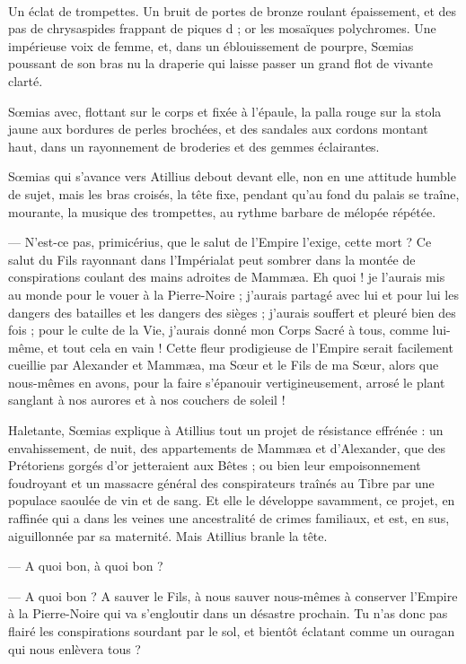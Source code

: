 \documentclass[a4paper, 11pt, oneside, polutonikogreek, french]{article}
\begin{document}
\paragraph{}
Un éclat de trompettes. Un bruit de portes de bronze roulant épaissement, et des pas de chrysaspides frappant de piques d ; or les mosaïques polychromes. Une impérieuse voix de femme, et, dans un éblouissement de pourpre, Sœmias poussant de son bras nu la draperie qui laisse passer un grand flot de vivante clarté.

Sœmias avec, flottant sur le corps et fixée à l'épaule, la palla rouge sur la stola jaune aux bordures de perles brochées, et des sandales aux cordons montant haut, dans un rayonnement de broderies et des gemmes éclairantes.

Sœmias qui s'avance vers Atillius debout devant elle, non en une attitude humble de sujet, mais les bras croisés, la tête fixe, pendant qu'au fond du palais se traîne, mourante, la musique des trompettes, au rythme barbare de mélopée répétée.

--- N'est-ce pas, primicérius, que le salut de l'Empire l'exige, cette mort ? Ce salut du Fils rayonnant dans l'Impérialat peut sombrer dans la montée de conspirations coulant des mains adroites de Mammæa. Eh quoi ! je l'aurais mis au monde pour le vouer à la Pierre-Noire ; j'aurais partagé avec lui et pour lui les dangers des batailles et les dangers des sièges ; j'aurais souffert et pleuré bien des fois ; pour le culte de la Vie, j'aurais donné mon Corps Sacré à tous, comme lui-même, et tout cela en vain ! Cette fleur prodigieuse de l'Empire serait facilement cueillie par Alexander et Mammæa, ma Sœur et le Fils de ma Sœur, alors que nous-mêmes en avons, pour la faire s'épanouir vertigineusement, arrosé le plant sanglant à nos aurores et à nos couchers de soleil !

Haletante, Sœmias explique à Atillius tout un projet de résistance effrénée : un envahissement, de nuit, des appartements de Mammæa et d'Alexander, que des Prétoriens gorgés d'or jetteraient aux Bêtes ; ou bien leur empoisonnement foudroyant et un massacre général des conspirateurs traînés au Tibre par une populace saoulée de vin et de sang. Et elle le développe savamment, ce projet, en raffinée qui a dans les veines une ancestralité de crimes familiaux, et est, en sus, aiguillonnée par sa maternité. Mais Atillius branle la tête.

--- A quoi bon, à quoi bon ?

--- A quoi bon ? A sauver le Fils, à nous sauver nous-mêmes à conserver l'Empire à la Pierre-Noire qui va s'engloutir dans un désastre prochain. Tu n'as donc pas flairé les conspirations sourdant par le sol, et bientôt éclatant comme un ouragan qui nous enlèvera tous ?
\end{document}
